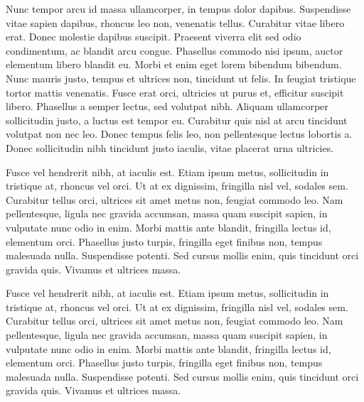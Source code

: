 Nunc tempor arcu id massa ullamcorper, in tempus dolor dapibus. Suspendisse vitae sapien dapibus, rhoncus leo non, venenatis tellus. Curabitur vitae libero erat. Donec molestie dapibus suscipit. Praesent viverra elit sed odio condimentum, ac blandit arcu congue. Phasellus commodo nisi ipsum, auctor elementum libero blandit eu. Morbi et enim eget lorem bibendum bibendum. Nunc mauris justo, tempus et ultrices non, tincidunt ut felis. In feugiat tristique tortor mattis venenatis. Fusce erat orci, ultricies ut purus et, efficitur suscipit libero. Phasellus a semper lectus, sed volutpat nibh. Aliquam ullamcorper sollicitudin justo, a luctus est tempor eu. Curabitur quis nisl at arcu tincidunt volutpat non nec leo. Donec tempus felis leo, non pellentesque lectus lobortis a. Donec sollicitudin nibh tincidunt justo iaculis, vitae placerat urna ultricies.

Fusce vel hendrerit nibh, at iaculis est. Etiam ipsum metus, sollicitudin in tristique at, rhoncus vel orci. Ut at ex dignissim, fringilla nisl vel, sodales sem. Curabitur tellus orci, ultrices sit amet metus non, feugiat commodo leo. Nam pellentesque, ligula nec gravida accumsan, massa quam suscipit sapien, in vulputate nunc odio in enim. Morbi mattis ante blandit, fringilla lectus id, elementum orci. Phasellus justo turpis, fringilla eget finibus non, tempus malesuada nulla. Suspendisse potenti. Sed cursus mollis enim, quis tincidunt orci gravida quis. Vivamus et ultrices massa.

Fusce vel hendrerit nibh, at iaculis est. Etiam ipsum metus, sollicitudin in tristique at, rhoncus vel orci. Ut at ex dignissim, fringilla nisl vel, sodales sem. Curabitur tellus orci, ultrices sit amet metus non, feugiat commodo leo. Nam pellentesque, ligula nec gravida accumsan, massa quam suscipit sapien, in vulputate nunc odio in enim. Morbi mattis ante blandit, fringilla lectus id, elementum orci. Phasellus justo turpis, fringilla eget finibus non, tempus malesuada nulla. Suspendisse potenti. Sed cursus mollis enim, quis tincidunt orci gravida quis. Vivamus et ultrices massa.

